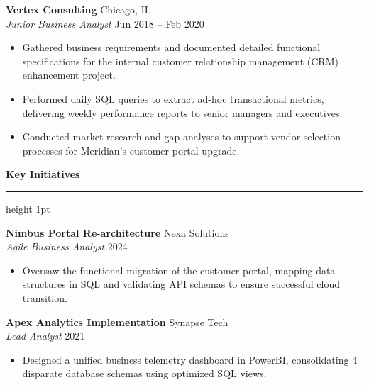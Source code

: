 \documentclass[10pt]{article}
\newcommand{\ressection}[1]{%
  \vspace{0.8em}%
  {\large\bfseries\color{primary} #1}%
  \vspace{0.2em}%
  {\color{accent}\hrule height 1pt}%
  \vspace{0.5em}%
}
\newcommand{\jobentry}[4]{%
  {\bfseries\color{textdark} #1} \hfill {\color{secondary}\small #2} \\
  {\itshape\color{accent} #3} \hfill {\color{secondary}\small #4} \\
  \vspace{0.2em}%
}
\begin{document}
\begin{minipage}[t]{0.62\textwidth}
  \jobentry{Vertex Consulting}{Chicago, IL}{Junior Business Analyst}{Jun 2018 -- Feb 2020}
  \begin{itemize}[leftmargin=1.1em, topsep=0pt, itemsep=0.25em, parsep=0pt]
    \item Gathered business requirements and documented detailed functional specifications for the internal customer relationship management (CRM) enhancement project.
    \item Performed daily SQL queries to extract ad-hoc transactional metrics, delivering weekly performance reports to senior managers and executives.
    \item Conducted market research and gap analyses to support vendor selection processes for Meridian's customer portal upgrade.
  \end{itemize}

  \ressection{Key Initiatives}
  
  {\bfseries\color{textdark} Nimbus Portal Re-architecture} \hfill {\color{secondary}\small Nexa Solutions} \\
  {\itshape\color{secondary}\small Agile Business Analyst} \hfill {\color{secondary}\small 2024}
  \begin{itemize}[leftmargin=1.1em, topsep=0.1em, itemsep=0.15em, parsep=0pt]
    \item Oversaw the functional migration of the customer portal, mapping data structures in SQL and validating API schemas to ensure successful cloud transition.
  \end{itemize}
  
  \vspace{0.4em}
  
  {\bfseries\color{textdark} Apex Analytics Implementation} \hfill {\color{secondary}\small Synapse Tech} \\
  {\itshape\color{secondary}\small Lead Analyst} \hfill {\color{secondary}\small 2021}
  \begin{itemize}[leftmargin=1.1em, topsep=0.1em, itemsep=0.15em, parsep=0pt]
    \item Designed a unified business telemetry dashboard in PowerBI, consolidating 4 disparate database schemas using optimized SQL views.
  \end{itemize}

\end{minipage}
\hfill
\end{document}
